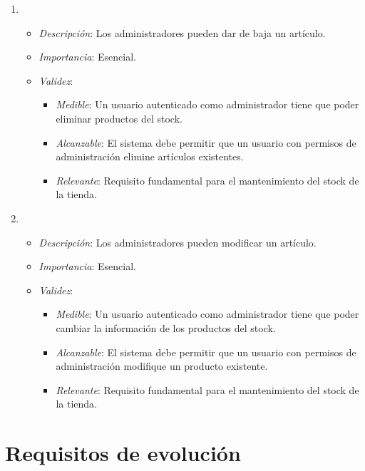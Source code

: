 \begin{enumerate}[{\bf RF-1}]
\item 
  \begin{itemize}
  \item \textit{Descripción}: Los administradores pueden dar de baja un artículo.
  \item \textit{Importancia}: Esencial.
  \item \textit{Validez}:
    \begin{itemize}
    \item \textit{Medible}: Un usuario autenticado como administrador tiene que poder eliminar productos del stock.
    \item \textit{Alcanzable}: El sistema debe permitir que un usuario con permisos de administración elimine artículos existentes.
    \item \textit{Relevante}: Requisito fundamental para el mantenimiento del stock de la tienda.
    \end{itemize}
  \end{itemize}

\item 
  \begin{itemize}
  \item \textit{Descripción}: Los administradores pueden modificar un artículo.
  \item \textit{Importancia}: Esencial.
  \item \textit{Validez}:
    \begin{itemize}
    \item \textit{Medible}: Un usuario autenticado como administrador tiene que poder cambiar la información de los productos del stock.
    \item \textit{Alcanzable}: El sistema debe permitir que un usuario con permisos de administración modifique un producto existente.
    \item \textit{Relevante}: Requisito fundamental para el mantenimiento del stock de la tienda.
    \end{itemize}
  \end{itemize}


\end{enumerate}



\section{Requisitos de evolución}

